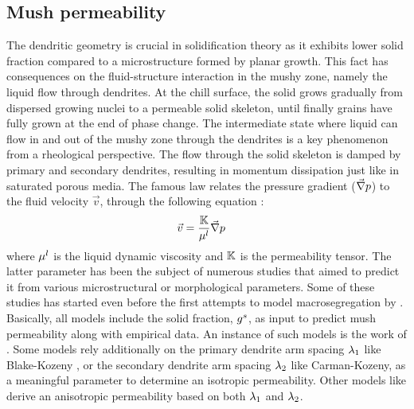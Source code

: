 \subsection{Mush permeability}
The dendritic geometry is crucial in solidification theory as it exhibits lower solid fraction compared to a microstructure formed by planar growth.
This fact has consequences on the fluid-structure interaction in the mushy zone, namely the liquid flow through dendrites. At the chill surface,
the solid  grows gradually from dispersed growing nuclei to a permeable solid skeleton, until finally grains have fully grown at the end of phase change.
The intermediate state where liquid can flow in and out of the mushy zone through the dendrites is a key phenomenon from a rheological perspective.
The flow through the solid skeleton is damped by primary and secondary dendrites, resulting in momentum dissipation just like in saturated porous media. 
The famous \citet{darcy_les_1856} law relates the pressure gradient ($\vec{\nabla} p$) to the fluid velocity $\vec{v}$, through the following equation \citep{rappaz_numerical_2003}:
\begin{align}
\label{eq:darcy}
& \vec{v} = \frac{\mathbb{K}}{\mu^l} \vec{\nabla} p
\end{align}
where $\mu^l$ is the liquid dynamic viscosity and $\mathbb{K}$ is the permeability tensor. The latter parameter has been the subject of numerous studies that aimed
to predict it from various microstructural or morphological parameters.
Some of these studies has started even before the first attempts to model macrosegregation by \citet{flemings_macrosegregation:_1967, flemings_macrosegregation:_1968-1,flemings_macrosegregation:_1968}. Basically, all models include the solid fraction, ${g^s}$, as input 
to predict mush permeability along with empirical data. An instance of such models is the work of \citet{xu_gravity-_1991}.
Some models rely additionally on the primary dendrite arm spacing ${\lambda}_{1}$ like Blake-Kozeny \citep{ramirez_evaluation_2003}, or the secondary 
dendrite arm spacing ${\lambda}_{2}$ like Carman-Kozeny, as a meaningful parameter to determine an isotropic permeability. 
Other models like \citet{poirier_permeability_1987,felicelli_simulation_1991} derive an anisotropic permeability based on both ${\lambda}_{1}$ and ${\lambda}_{2}$.

